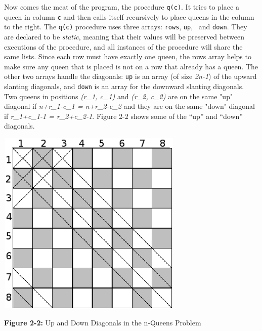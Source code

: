 Now comes the meat of the program, the procedure \texttt{q(c)}. It tries
to place a queen in column \texttt{c} and then calls itself recursively
to place queens in the column to the right. The \texttt{q(c)} procedure
uses three arrays: \texttt{rows}, \texttt{up}, \ and \texttt{down}.
They are declared to be \textit{static}, meaning that their values will
be preserved between executions of the procedure, and all
instances of the procedure will share the same lists.
Since each row must have exactly one queen, the rows array helps to
make sure any queen that is placed is not on a row that already has a
queen. The other two arrays handle the diagonals: \texttt{up} is an
array (of size \textit{2n-1}) of the upward slanting diagonals, and
\texttt{down} is an array for the downward slanting diagonals. Two
queens in positions \textit{(r\_1, c\_1)} and \textit{(r\_2, c\_2)} are
on the same "up" diagonal if
\textit{n+r\_1-c\_1 = n+r\_2-c\_2} and they are on the same
"down" diagonal if \textit{r\_1+c\_1-1 =
r\_2+c\_2-1}. Figure 2-2 shows some of the
``up'' and ``down'' diagonals.

\bigskip

\begin{center}
\includegraphics[width=3.5in,height=3.5in]{ub-img/diagonal.png}
\end{center}
{\sffamily\bfseries Figure 2-2:}
{\sffamily Up and Down Diagonals in the n-Queens Problem}

\bigskip


